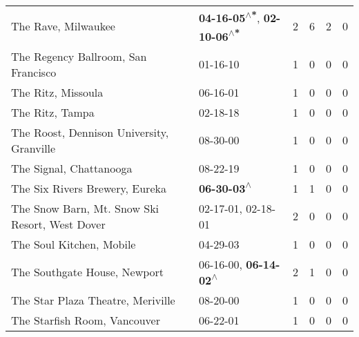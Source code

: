 \begin{supertabular}{p{0.4\textwidth}p{0.3\textwidth}p{0.05\textwidth}p{0.05\textwidth}p{0.05\textwidth}p{0.05\textwidth}}
                                                          The Rave, Milwaukee &  \textbf{04-16-05\textsuperscript{$\wedge$*}}, \textbf{02-10-06\textsuperscript{$\wedge$*}} &  2 &  6 &  2 &  0 \\
                                          The Regency Ballroom, San Francisco &                                                                  01-16-10\textsuperscript{} &  1 &  0 &  0 &  0 \\
                                                           The Ritz, Missoula &                                                                  06-16-01\textsuperscript{} &  1 &  0 &  0 &  0 \\
                                                              The Ritz, Tampa &                                                                  02-18-18\textsuperscript{} &  1 &  0 &  0 &  0 \\
                                    The Roost, Dennison University, Granville &                                                                  08-30-00\textsuperscript{} &  1 &  0 &  0 &  0 \\
                                                      The Signal, Chattanooga &                                                                  08-22-19\textsuperscript{} &  1 &  0 &  0 &  0 \\
                                               The Six Rivers Brewery, Eureka &                                                 \textbf{06-30-03\textsuperscript{$\wedge$}} &  1 &  1 &  0 &  0 \\
                               The Snow Barn, Mt. Snow Ski Resort, West Dover &                                      02-17-01\textsuperscript{}, 02-18-01\textsuperscript{} &  2 &  0 &  0 &  0 \\
                                                     The Soul Kitchen, Mobile &                                                                  04-29-03\textsuperscript{} &  1 &  0 &  0 &  0 \\
                                                 The Southgate House, Newport &                     06-16-00\textsuperscript{}, \textbf{06-14-02\textsuperscript{$\wedge$}} &  2 &  1 &  0 &  0 \\
                                            The Star Plaza Theatre, Meriville &                                                                  08-20-00\textsuperscript{} &  1 &  0 &  0 &  0 \\
                                                 The Starfish Room, Vancouver &                                                                  06-22-01\textsuperscript{} &  1 &  0 &  0 &  0 \\

\end{supertabular}
